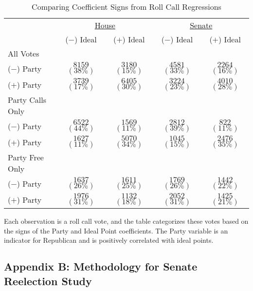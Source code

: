\documentclass[12pt]{article}
\begin{document}
\begin{table}[!htbp]
\centering
\begin{threeparttable}
\singlespacing
\caption{Comparing Coefficient Signs from Roll Call Regressions}
\label{tab-sorting}
\begin{tabular}{l cc|cc}
\hline
&\multicolumn{2}{c}{\underline{House}}&\multicolumn{2}{c}{\underline{Senate}}\\
& ($-$) Ideal & ($+$) Ideal & ($-$) Ideal & ($+$) Ideal \\
\hline
All Votes \\
\hline
($-$) Party & $8159$ $(38\%)$ & $3180$ $(15\%)$ & $4581$ $(33\%)$ & $2264$ $(16\%)$ \\
($+$) Party & $3739$ $(17\%)$ & $6405$ $(30\%)$ & $3224$ $(23\%)$ & $4010$ $(28\%)$ \\
\hline
Party Calls Only\\
\hline
($-$) Party & $6522$ $(44\%)$ & $1569$ $(11\%)$ & $2812$ $(39\%)$ & $822$ $(11\%)$ \\
($+$) Party & $1627$ $(11\%)$ & $5070$ $(34\%)$ & $1045$ $(15\%)$ & $2476$ $(35\%)$ \\
\hline
Party Free Only\\
\hline
($-$) Party & $1637$ $(26\%)$ & $1611$ $(25\%)$ & $1769$ $(26\%)$ & $1442$ $(22\%)$ \\
($+$) Party & $1976$ $(31\%)$ & $1132$ $(18\%)$ & $2052$ $(31\%)$ & $1425$ $(21\%)$ \\
\hline
\end{tabular}
\begin{tablenotes}
   \item
   Each observation is a roll call vote, and the table categorizes these votes based on the signs of the Party and Ideal Point coefficients.  The Party variable is an indicator for Republican and is positively correlated with ideal points.
 \end{tablenotes}
\end{threeparttable}
\end{table}

\clearpage

\subsection*{Appendix B: Methodology for Senate Reelection Study}
%
\end{document}
